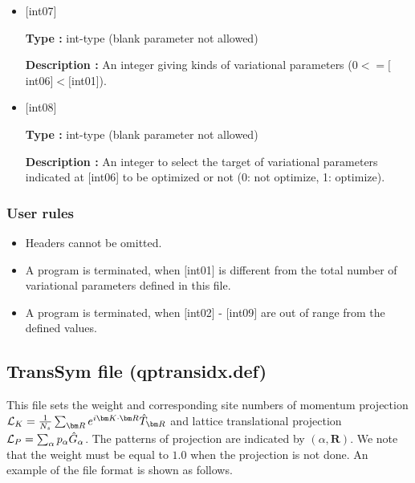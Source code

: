 \begin{itemize}
  {\bf Description :} When the mode of the anti-periodic condition turns on (the mode turns on when the value of \verb|NMPTrans| in \verb|ModPara| file is negative), the sign of $f_{ij}$ is specified by setting $[$int06$]=\pm1$. This term can be omitted when the mode of the anti-periodic condition is off.

 \item  $[$int07$]$
   
   {\bf Type :} int-type (blank parameter not allowed)

  {\bf Description :} An integer giving kinds of variational  parameters ($0<= [$int06$]<[$int01]).   
 \item  $[$int08$]$
   
   {\bf Type :} int-type (blank parameter not allowed)

  {\bf Description :} An integer to select the target of variational parameters indicated at [int06] to be optimized or not (0: not optimize, 1: optimize).
  
  
\end{itemize}

\subsubsection{User rules}
\begin{itemize}
\item Headers cannot be omitted. 
\item A program is terminated, when $[$int01$]$ is different from the total number of variational parameters defined in this file.
\item A program is terminated, when $[$int02$]$ - $[$int09$]$ are out of range from the defined values.
\end{itemize}

\newpage
\subsection{TransSym file (qptransidx.def)}
\label{Subsec:TransSym}
This file sets the weight and corresponding site numbers of momentum projection
${\cal L}_K=\frac{1}{N_s}\sum_{{\bm R}}e^{i {\bm K} \cdot{\bm R} } \hat{T}_{\bm R}$
and lattice translational projection 
${\cal L}_P=\sum_{\alpha}p_{\alpha} \hat{G}_{\alpha}$. 
The patterns of projection are indicated by $(\alpha, {\bm R})$.
We note that the weight must be equal to $1.0$ when the projection is not done.
An example of the file format is shown as follows.

